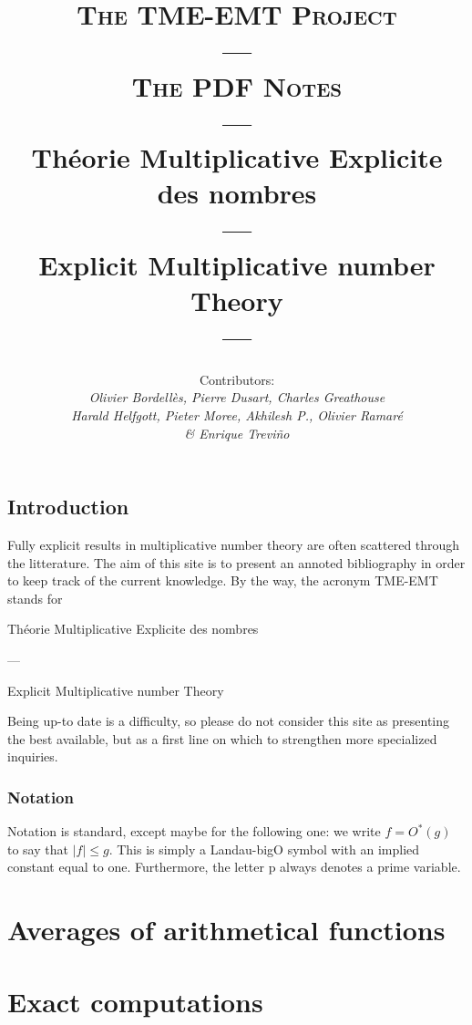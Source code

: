 \documentclass[10pt,twoside, svgnames]{book}
\title{{\textsc{\Huge The TME-EMT Project
         \\---\\[1ex]
      The PDF Notes\\[2ex]
       ---}}\\[1ex]
       {\huge Th\'eorie Multiplicative Explicite des nombres
         \\ ---\\[1ex]
         Explicit Multiplicative number Theory
         }
     \\[1ex]
       ---}
\author{Contributors:\\ {\sl Olivier Bordell\`es, Pierre Dusart,
    Charles Greathouse}\\ {\sl Harald Helfgott, Pieter
  Moree, Akhilesh P.,  Olivier Ramar\'e} \\ {\sl \& Enrique Trevi\~no}}
\begin{document}
\frontmatter
\maketitle


\mainmatter
\chapter*{Introduction}

Fully explicit results in multiplicative number theory are often
scattered through the litterature. The aim of this site is to present
an annoted bibliography in order to keep track of the current
knowledge. By the way, the acronym TME-EMT stands for 
\begin{center}
    Th\'eorie Multiplicative Explicite des nombres  

    ---

    Explicit
    Multiplicative number Theory 
\end{center}

Being up-to date is a difficulty, so please do not consider this site
as presenting the best available, but as a first line on which to
strengthen more specialized inquiries.

  {\small \tableofcontents\par}

\vfill
\section*{Notation}

Notation is standard, except maybe for the following one: we write
$f=O^*(g)$ to say that $|f|\le g$. This is simply a Landau-bigO symbol
with an implied constant equal to one. Furthermore, the letter p
always denotes a prime variable.

\part{Averages of arithmetical functions}







\part{Exact computations}
\end{document}

